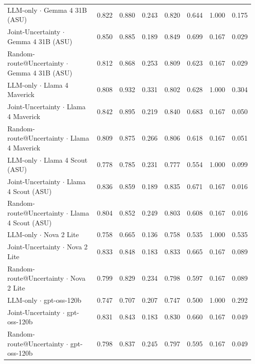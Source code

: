 \begin{table}[htbp]
\begin{tabular}{lccccccc}
LLM-only $\cdot$ Gemma 4 31B (ASU) & 0.822 & 0.880 & 0.243 & 0.820 & 0.644 & 1.000 & 0.175 \\
Joint-Uncertainty $\cdot$ Gemma 4 31B (ASU) & 0.850 & 0.885 & 0.189 & 0.849 & 0.699 & 0.167 & 0.029 \\
Random-route@Uncertainty $\cdot$ Gemma 4 31B (ASU) & 0.812 & 0.868 & 0.253 & 0.809 & 0.623 & 0.167 & 0.029 \\
LLM-only $\cdot$ Llama 4 Maverick & 0.808 & 0.932 & 0.331 & 0.802 & 0.628 & 1.000 & 0.304 \\
Joint-Uncertainty $\cdot$ Llama 4 Maverick & 0.842 & 0.895 & 0.219 & 0.840 & 0.683 & 0.167 & 0.050 \\
Random-route@Uncertainty $\cdot$ Llama 4 Maverick & 0.809 & 0.875 & 0.266 & 0.806 & 0.618 & 0.167 & 0.051 \\
LLM-only $\cdot$ Llama 4 Scout (ASU) & 0.778 & 0.785 & 0.231 & 0.777 & 0.554 & 1.000 & 0.099 \\
Joint-Uncertainty $\cdot$ Llama 4 Scout (ASU) & 0.836 & 0.859 & 0.189 & 0.835 & 0.671 & 0.167 & 0.016 \\
Random-route@Uncertainty $\cdot$ Llama 4 Scout (ASU) & 0.804 & 0.852 & 0.249 & 0.803 & 0.608 & 0.167 & 0.016 \\
LLM-only $\cdot$ Nova 2 Lite & 0.758 & 0.665 & 0.136 & 0.758 & 0.535 & 1.000 & 0.535 \\
Joint-Uncertainty $\cdot$ Nova 2 Lite & 0.833 & 0.848 & 0.183 & 0.833 & 0.665 & 0.167 & 0.089 \\
Random-route@Uncertainty $\cdot$ Nova 2 Lite & 0.799 & 0.829 & 0.234 & 0.798 & 0.597 & 0.167 & 0.089 \\
LLM-only $\cdot$ gpt-oss-120b & 0.747 & 0.707 & 0.207 & 0.747 & 0.500 & 1.000 & 0.292 \\
Joint-Uncertainty $\cdot$ gpt-oss-120b & 0.831 & 0.843 & 0.183 & 0.830 & 0.660 & 0.167 & 0.049 \\
Random-route@Uncertainty $\cdot$ gpt-oss-120b & 0.798 & 0.837 & 0.245 & 0.797 & 0.595 & 0.167 & 0.049 \\
\bottomrule
\end{tabular}
\end{table}